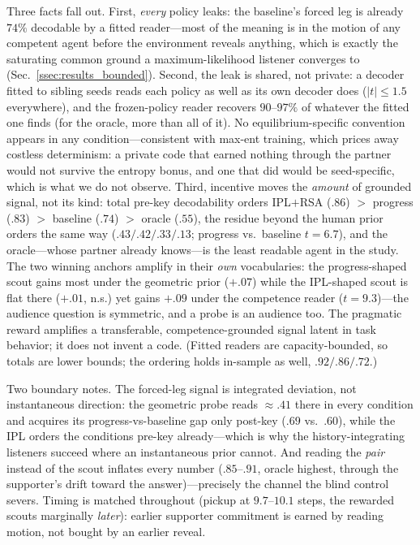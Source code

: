 \documentclass[sigconf,review,anonymous]{acmart}
\begin{document}
Three facts fall out. First, \emph{every} policy leaks: the baseline's forced leg is already $74\%$ decodable by a fitted reader---most of the meaning is in the motion of any competent agent before the environment reveals anything, which is exactly the saturating common ground a maximum-likelihood listener converges to (Sec.~\ref{ssec:results_bounded}). Second, the leak is shared, not private: a decoder fitted to sibling seeds reads each policy as well as its own decoder does ($|t|{\le}1.5$ everywhere), and the frozen-policy reader recovers $90$--$97\%$ of whatever the fitted one finds (for the oracle, more than all of it). No equilibrium-specific convention appears in any condition---consistent with max-ent training, which prices away costless determinism: a private code that earned nothing through the partner would not survive the entropy bonus, and one that did would be seed-specific, which is what we do not observe. Third, incentive moves the \emph{amount} of grounded signal, not its kind: total pre-key decodability orders IPL$+$RSA ($.86$) $>$ progress ($.83$) $>$ baseline ($.74$) $>$ oracle ($.55$), the residue beyond the human prior orders the same way ($.43/.42/.33/.13$; progress vs.\ baseline $t{=}6.7$), and the oracle---whose partner already knows---is the least readable agent in the study. The two winning anchors amplify in their \emph{own} vocabularies: the progress-shaped scout gains most under the geometric prior ($+.07$) while the IPL-shaped scout is flat there ($+.01$, n.s.) yet gains $+.09$ under the competence reader ($t{=}9.3$)---the audience question is symmetric, and a probe is an audience too. The pragmatic reward amplifies a transferable, competence-grounded signal latent in task behavior; it does not invent a code. (Fitted readers are capacity-bounded, so totals are lower bounds; the ordering holds in-sample as well, $.92/.86/.72$.)

Two boundary notes. The forced-leg signal is integrated deviation, not instantaneous direction: the geometric probe reads ${\approx}.41$ there in every condition and acquires its progress-vs-baseline gap only post-key ($.69$ vs.\ $.60$), while the IPL orders the conditions pre-key already---which is why the history-integrating listeners succeed where an instantaneous prior cannot. And reading the \emph{pair} instead of the scout inflates every number ($.85$--$.91$, oracle highest, through the supporter's drift toward the answer)---precisely the channel the blind control severs. Timing is matched throughout (pickup at $9.7$--$10.1$ steps, the rewarded scouts marginally \emph{later}): earlier supporter commitment is earned by reading motion, not bought by an earlier reveal.
\end{document}
